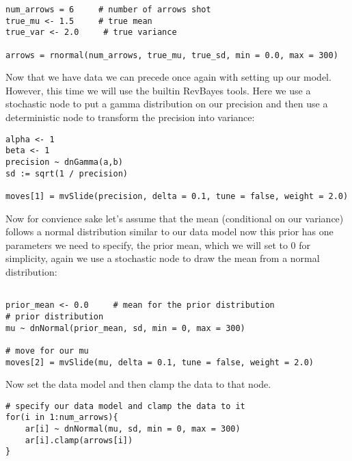 {\tt \begin{snugshade*}
\begin{lstlisting}
num_arrows = 6     # number of arrows shot
true_mu <- 1.5     # true mean
true_var <- 2.0     # true variance

arrows = rnormal(num_arrows, true_mu, true_sd, min = 0.0, max = 300)
\end{lstlisting}
\end{snugshade*}}

Now that we have data we can precede once again with setting up our model. However, this time we will use the builtin RevBayes tools. Here we use a stochastic node to put a gamma distribution on our precision and then use a deterministic node to transform the precision into variance:

{\tt \begin{snugshade*}
 \begin{lstlisting}
alpha <- 1
beta <- 1
precision ~ dnGamma(a,b) 
sd := sqrt(1 / precision)

moves[1] = mvSlide(precision, delta = 0.1, tune = false, weight = 2.0)
\end{lstlisting}
\end{snugshade*}}

Now for convience sake let's assume that the mean (conditional on our variance) follows a normal distribution similar to our data model now this prior has one parameters we need to specify, the prior mean, which we will set to 0 for simplicity, again we use a stochastic node to draw the mean from a normal distribution:

{\tt \begin{snugshade*}
 \begin{lstlisting}
 
prior_mean <- 0.0     # mean for the prior distribution
# prior distribution 
mu ~ dnNormal(prior_mean, sd, min = 0, max = 300)

# move for our mu
moves[2] = mvSlide(mu, delta = 0.1, tune = false, weight = 2.0)
\end{lstlisting}
\end{snugshade*}}

Now set the data model and then clamp the data to that node.

{\tt \begin{snugshade*}
 \begin{lstlisting}
# specify our data model and clamp the data to it
for(i in 1:num_arrows){
	ar[i] ~ dnNormal(mu, sd, min = 0, max = 300)
	ar[i].clamp(arrows[i])
}
\end{lstlisting}
\end{snugshade*}}

